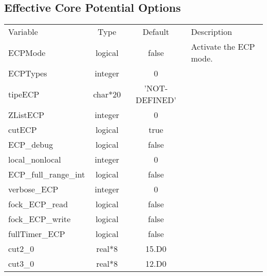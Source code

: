 \documentclass[journal=jctcce,manuscript=article]{achemso}
\begin{document}
    \subsection{Effective Core Potential Options}
    \begin{table}  [H]
      \begin{center}
      \begin{tabular}{ l c c l}
         Variable & Type & Default & Description \\
         ECPMode & logical & false & Activate the ECP mode. \\
         ECPTypes & integer & 0 & \\
         tipeECP & char*20 & 'NOT-DEFINED' & \\
         ZListECP & integer & 0 & \\
         cutECP & logical & true & \\
         ECP\_debug &  logical & false & \\
         local\_nonlocal & integer & 0 & \\
         ECP\_full\_range\_int & logical & false & \\
         verbose\_ECP & integer & 0 & \\
         fock\_ECP\_read & logical & false & \\
         fock\_ECP\_write & logical & false & \\
         fullTimer\_ECP & logical & false & \\
         cut2\_0 & real*8 & 15.D0 & \\
         cut3\_0 & real*8 & 12.D0 & \\
       \end{tabular}
       \end{center}
      \label{lio.ecp.var}
    \end{table}    
\end{document}

